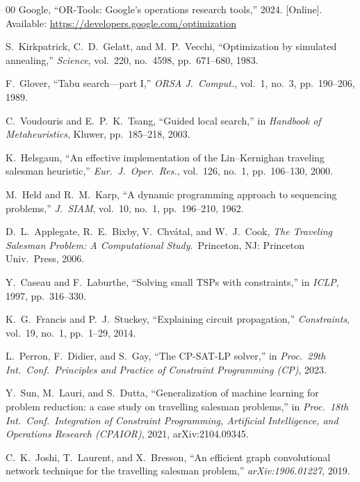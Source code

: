 \documentclass[conference]{IEEEtran}
\begin{document}
\begin{thebibliography}{00}
 Google, ``OR-Tools: Google's operations research tools,'' 2024. [Online]. Available: \url{https://developers.google.com/optimization}

 S.~Kirkpatrick, C.~D.~Gelatt, and M.~P.~Vecchi, ``Optimization by simulated annealing,'' \emph{Science}, vol.~220, no.~4598, pp.~671--680, 1983.

 F.~Glover, ``Tabu search---part I,'' \emph{ORSA J.\ Comput.}, vol.~1, no.~3, pp.~190--206, 1989.

 C.~Voudouris and E.~P.~K.~Tsang, ``Guided local search,'' in \emph{Handbook of Metaheuristics}, Kluwer, pp.~185--218, 2003.

 K.~Helsgaun, ``An effective implementation of the Lin--Kernighan traveling salesman heuristic,'' \emph{Eur.\ J.\ Oper.\ Res.}, vol.~126, no.~1, pp.~106--130, 2000.

 M.~Held and R.~M.~Karp, ``A dynamic programming approach to sequencing problems,'' \emph{J.\ SIAM}, vol.~10, no.~1, pp.~196--210, 1962.

 D.~L.~Applegate, R.~E.~Bixby, V.~Chv\'atal, and W.~J.~Cook, \emph{The Traveling Salesman Problem: A Computational Study}.\ Princeton, NJ: Princeton Univ.\ Press, 2006.

 Y.~Caseau and F.~Laburthe, ``Solving small TSPs with constraints,'' in \emph{ICLP}, 1997, pp.~316--330.

 K.~G.~Francis and P.~J.~Stuckey, ``Explaining circuit propagation,'' \emph{Constraints}, vol.~19, no.~1, pp.~1--29, 2014.

 L.~Perron, F.~Didier, and S.~Gay, ``The CP-SAT-LP solver,'' in \emph{Proc.\ 29th Int.\ Conf.\ Principles and Practice of Constraint Programming (CP)}, 2023.

 Y.~Sun, M.~Lauri, and S.~Dutta, ``Generalization of machine learning for problem reduction: a case study on travelling salesman problems,'' in \emph{Proc.\ 18th Int.\ Conf.\ Integration of Constraint Programming, Artificial Intelligence, and Operations Research (CPAIOR)}, 2021, arXiv:2104.09345.

 C.~K.~Joshi, T.~Laurent, and X.~Bresson, ``An efficient graph convolutional network technique for the travelling salesman problem,'' \emph{arXiv:1906.01227}, 2019.


\end{thebibliography}
\end{document}

